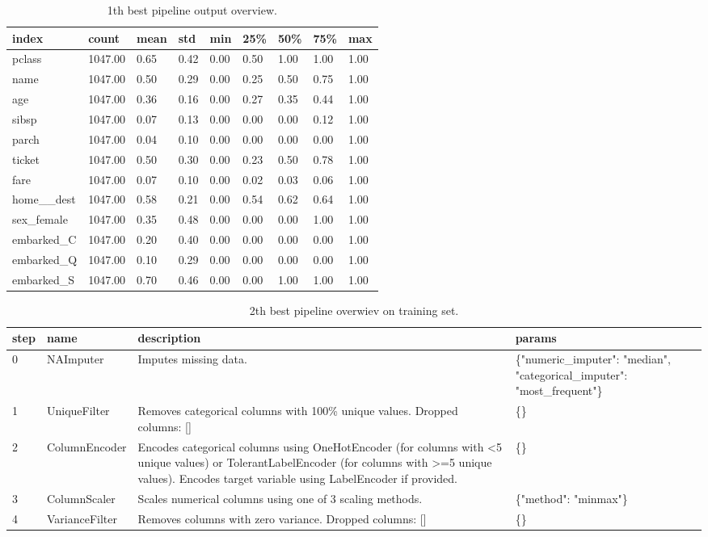 \documentclass{article}%
\begin{document}
%


\begin{table}[H]%
\begin{center}%
\begin{tabular}{l l l l l l l l l}%
\hline%
\textbf{index}&\textbf{count}&\textbf{mean}&\textbf{std}&\textbf{min}&\textbf{25\%}&\textbf{50\%}&\textbf{75\%}&\textbf{max}\\%
\hline%
pclass&1047.00&0.65&0.42&0.00&0.50&1.00&1.00&1.00\\%
name&1047.00&0.50&0.29&0.00&0.25&0.50&0.75&1.00\\%
age&1047.00&0.36&0.16&0.00&0.27&0.35&0.44&1.00\\%
sibsp&1047.00&0.07&0.13&0.00&0.00&0.00&0.12&1.00\\%
parch&1047.00&0.04&0.10&0.00&0.00&0.00&0.00&1.00\\%
ticket&1047.00&0.50&0.30&0.00&0.23&0.50&0.78&1.00\\%
fare&1047.00&0.07&0.10&0.00&0.02&0.03&0.06&1.00\\%
home\_\_dest&1047.00&0.58&0.21&0.00&0.54&0.62&0.64&1.00\\%
sex\_female&1047.00&0.35&0.48&0.00&0.00&0.00&1.00&1.00\\%
embarked\_C&1047.00&0.20&0.40&0.00&0.00&0.00&0.00&1.00\\%
embarked\_Q&1047.00&0.10&0.29&0.00&0.00&0.00&0.00&1.00\\%
embarked\_S&1047.00&0.70&0.46&0.00&0.00&1.00&1.00&1.00\\%
\hline%
\end{tabular}%
\end{center}%
\caption{1th best pipeline output overview.}%
\end{table}

%


\begin{table}[H]%
\begin{center}%
\begin{tabular}{p{10mm} p{30mm} p{60mm} p{60mm}}%
\hline%
\textbf{step}&\textbf{name}&\textbf{description}&\textbf{params}\\%
\hline%
0&NAImputer&Imputes missing data.&\{"numeric\_imputer": "median", "categorical\_imputer": "most\_frequent"\}\\%
1&UniqueFilter&Removes categorical columns with 100\% unique values. Dropped columns: {[}{]}&\{\}\\%
2&ColumnEncoder&Encodes categorical columns using OneHotEncoder (for columns with <5 unique values) or TolerantLabelEncoder (for columns with >=5 unique values). Encodes target variable using LabelEncoder if provided.&\{\}\\%
3&ColumnScaler&Scales numerical columns using one of 3 scaling methods.&\{"method": "minmax"\}\\%
4&VarianceFilter&Removes columns with zero variance. Dropped columns: {[}{]}&\{\}\\%
\hline%
\end{tabular}%
\end{center}%
\caption{2th best pipeline overwiev on training set.}%
\end{table}
\end{document}
